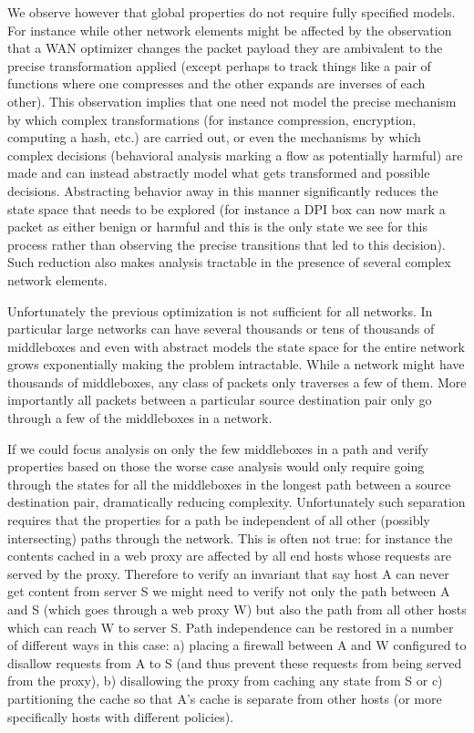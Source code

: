 \documentclass[letterpaper]{article}
\begin{document}
We observe however that global properties do not require fully specified models. For instance while other
network elements might be affected by the observation that a WAN optimizer changes the packet payload they are
ambivalent to the precise transformation applied (except perhaps to track things like a pair of functions
where one compresses and the other expands are inverses of each other). This observation implies that one need
not model the precise mechanism by which complex transformations (for instance compression, encryption,
computing a hash, etc.) are carried out, or even the mechanisms by which complex decisions (behavioral
analysis marking a flow as potentially harmful) are made and can instead abstractly model what gets
transformed and possible decisions. Abstracting behavior away in this manner significantly reduces the state
space that needs to be explored (for instance a DPI box can now mark a packet as either benign or harmful and
this is the only state we see for this process rather than observing the precise transitions that led to this
decision). Such reduction also makes analysis tractable in the presence of several complex network elements.

Unfortunately the previous optimization is not sufficient for all networks. In particular large networks can
have several thousands or tens of thousands of middleboxes and even with abstract models the state space for the
entire network grows exponentially making the problem intractable. While a network might have thousands of
middleboxes, any class of packets only traverses a few of them. More importantly all packets between a
particular source destination pair only go through a few of the middleboxes in a network. 

If we could focus analysis on only the few middleboxes in a path and verify properties based on those the
worse case analysis would only require going through the states for all the middleboxes in the longest path
between a source destination pair, dramatically reducing complexity. Unfortunately such separation requires
that the properties for a path be independent of all other (possibly intersecting) paths through the network.
This is often not true: for instance the contents cached in a web proxy are affected by all end hosts whose
requests are served by the proxy. Therefore to verify an invariant that say host A can never get content from
server S we might need to verify not only the path between A and S (which goes through a web proxy W) but also
the path from all other hosts which can reach W to server S. Path independence can be restored in a number of
different ways in this case: a) placing a firewall between A and W configured to disallow requests from A to S
(and thus prevent these requests from being served from the proxy), b) disallowing the proxy from caching any
state from S or c) partitioning the cache so that A's cache is separate from other hosts (or more specifically
hosts with different policies). 
\end{document}
